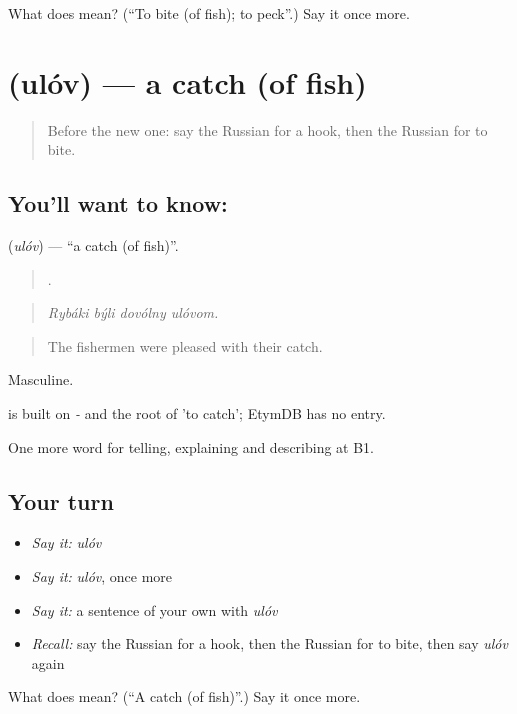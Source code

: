\begin{tcolorbox}[breakable,colback=teal!4,colframe=teal!35!black,title={Before you move on}]
What does  mean? (\textquotedblleft{}To bite (of fish); to peck\textquotedblright{}.) Say it once more.
\end{tcolorbox}
\section[\texorpdfstring{\ru{улов} (ulóv)}{улов (ulóv)}]{ (ulóv) — a catch (of fish)}

\label{lesson:RU-C505-ulov}



\begin{quote}
Before the new one: say the Russian for a hook, then the Russian for to bite.
\end{quote}

\subsection*{You'll want to know: }
\textbf{} (\emph{ulóv}) — \textquotedblleft{}a catch (of fish)\textquotedblright{}.

\begin{quote}
   .
\end{quote}

\begin{quote}
\emph{Rybáki býli dovólny ulóvom.}
\end{quote}

\begin{quote}
The fishermen were pleased with their catch.
\end{quote}

Masculine.

\begin{cousinweb}
\emph{} is built on \emph{-} and the root of \emph{} 'to catch'; EtymDB has no entry.
\end{cousinweb}

\begin{grammarlens}[title={What you've built}]
One more word for telling, explaining and describing at B1.
\end{grammarlens}

\subsection*{Your turn}
\begin{itemize}
\raggedright
  \item \emph{Say it:} \emph{ulóv}
  \item \emph{Say it:} \emph{ulóv}, once more
  \item \emph{Say it:} a sentence of your own with \emph{ulóv}
  \item \emph{Recall:} say the Russian for a hook, then the Russian for to bite, then say \emph{ulóv} again
\end{itemize}

\begin{tcolorbox}[breakable,colback=teal!4,colframe=teal!35!black,title={Before you move on}]
What does  mean? (\textquotedblleft{}A catch (of fish)\textquotedblright{}.) Say it once more.
\end{tcolorbox}
